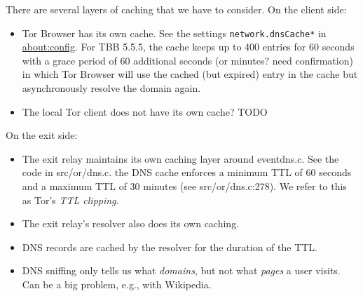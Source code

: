There are several layers of caching that we have to consider.  On the client
side:
\begin{itemize}
	\item Tor Browser has its own cache.  See the settings
		\texttt{network.dnsCache*} in \url{about:config}. For TBB 5.5.5, the
		cache keeps up to 400 entries for 60 seconds with a grace period of
		60 additional seconds (or minutes? need confirmation) in which Tor
		Browser will use the cached (but expired) entry in the cache but
		asynchronously resolve the domain again.
	\item The local Tor client does not have its own cache? TODO
\end{itemize}

On the exit side:
\begin{itemize}
	\item The exit relay maintains its own caching layer around eventdns.c.
	See the code in src/or/dns.c. the DNS cache enforces a minimum TTL of
	60 seconds and a maximum TTL of 30 minutes (see src/or/dns.c:278). We
	refer to this as Tor's \emph{TTL clipping}.
	\item The exit relay's resolver also does its own caching.
	\item DNS records are cached by the resolver for the duration of the TTL.
	\item DNS sniffing only tells us what \emph{domains}, but not what
		\emph{pages} a user visits.  Can be a big problem, e.g., with Wikipedia.
\end{itemize}
